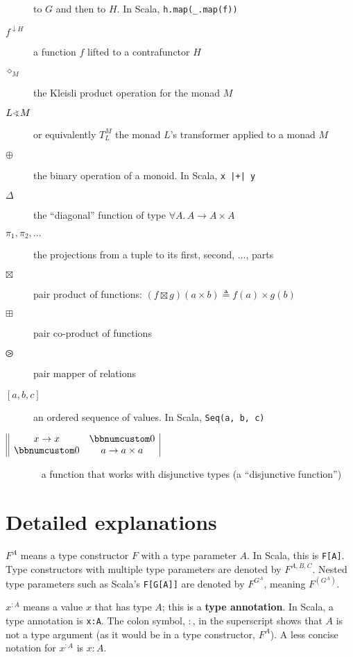\begin{description}
to $G$ and then to $H$. In Scala, \lstinline!h.map(_.map(f))! 
\item [{$f^{\downarrow H}$}] \textemdash{} a function $f$ lifted to a
contrafunctor $H$ 
\item [{$\diamond_{M}$}] \textemdash{} the Kleisli product operation for
the monad $M$
\item [{$L\varangle M$}] or equivalently $T_{L}^{M}$ \textemdash{} the
monad $L$\textsf{'}s transformer applied to a monad $M$
\item [{$\oplus$}] \textemdash{} the binary operation of a monoid. In
Scala, \lstinline!x |+| y!
\item [{$\Delta$}] \textemdash{} the \textsf{``}diagonal\textsf{''} function of type $\forall A.\,A\rightarrow A\times A$
\item [{$\pi_{1},\pi_{2},...$}] \textemdash{} the projections from a tuple
to its first, second, ..., parts
\item [{$\boxtimes$}] \textemdash{} pair product of functions: $(f\boxtimes g)(a\times b)\triangleq f(a)\times g(b)$
\item [{$\boxplus$}] \textemdash{} pair co-product of functions
\item [{$\ogreaterthan$}] \textemdash{} pair mapper of relations
\item [{$\left[a,b,c\right]$}] \textemdash{} an ordered sequence of values.
In Scala, \lstinline!Seq(a, b, c)!
\item [{$\begin{array}{||cc|}
x\rightarrow x & \bbnum 0\\
\bbnum 0 & a\rightarrow a\times a
\end{array}$}] ~ \textemdash{} a function that works with disjunctive types
(a \textsf{``}disjunctive function\textsf{''})
\end{description}

\section{Detailed explanations}

$F^{A}$ means a type constructor $F$ with a type parameter $A$.
In Scala, this is \lstinline!F[A]!. Type constructors with multiple
type parameters are denoted by $F^{A,B,C}$. Nested type parameters
such as Scala\textsf{'}s \lstinline!F[G[A]]! are denoted by $F^{G^{A}}$,
meaning $F^{(G^{A})}$.

$x^{:A}$ means a value $x$ that has type $A$; this is a \textbf{type
annotation}. In Scala, a type annotation is \lstinline!x:A!. The
colon symbol, $:$, in the superscript shows that $A$ is not a type
argument (as it would be in a type constructor, $F^{A}$). A less
concise notation for $x^{:A}$ is $x:A$.

